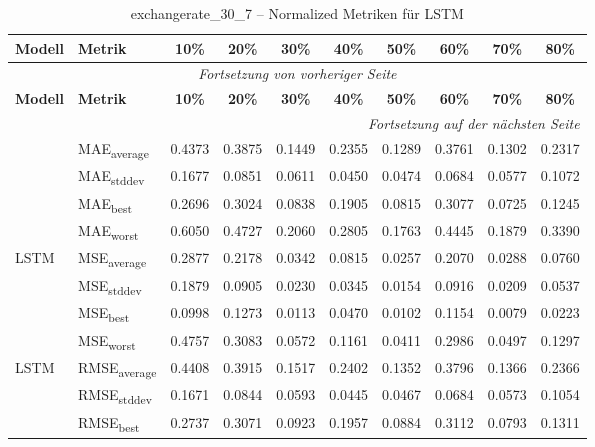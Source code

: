 {\small
\begin{longtable}{l l c c c c c c c c}
    \toprule
    \textbf{Modell} & \textbf{Metrik} & \textbf{10\%} & \textbf{20\%} & \textbf{30\%} & \textbf{40\%} & \textbf{50\%} & \textbf{60\%} & \textbf{70\%} & \textbf{80\%} \\
    \midrule
    \endfirsthead
    \multicolumn{10}{c}{\textit{Fortsetzung von vorheriger Seite}} \\
    \toprule
    \textbf{Modell} & \textbf{Metrik} & \textbf{10\%} & \textbf{20\%} & \textbf{30\%} & \textbf{40\%} & \textbf{50\%} & \textbf{60\%} & \textbf{70\%} & \textbf{80\%} \\
    \midrule
    \endhead
    \midrule
    \multicolumn{10}{r}{\textit{Fortsetzung auf der nächsten Seite}} \\
    \midrule
    \endfoot
    \bottomrule
    \caption{exchangerate_30_7 -- Normalized Metriken für LSTM}
    \label{tab:exchangerate_30_7_normalized_lstm}
    \endlastfoot
\multirow{4}{*}{LSTM} & MAE\textsubscript{average} & 0.4373 & 0.3875 & 0.1449 & 0.2355 & 0.1289 & 0.3761 & 0.1302 & 0.2317 \\
 & MAE\textsubscript{stddev} & 0.1677 & 0.0851 & 0.0611 & 0.0450 & 0.0474 & 0.0684 & 0.0577 & 0.1072 \\
 & MAE\textsubscript{best} & 0.2696 & 0.3024 & 0.0838 & 0.1905 & 0.0815 & 0.3077 & 0.0725 & 0.1245 \\
 & MAE\textsubscript{worst} & 0.6050 & 0.4727 & 0.2060 & 0.2805 & 0.1763 & 0.4445 & 0.1879 & 0.3390 \\
\cmidrule(lr){2-10}
\multirow{4}{*}{LSTM} & MSE\textsubscript{average} & 0.2877 & 0.2178 & 0.0342 & 0.0815 & 0.0257 & 0.2070 & 0.0288 & 0.0760 \\
 & MSE\textsubscript{stddev} & 0.1879 & 0.0905 & 0.0230 & 0.0345 & 0.0154 & 0.0916 & 0.0209 & 0.0537 \\
 & MSE\textsubscript{best} & 0.0998 & 0.1273 & 0.0113 & 0.0470 & 0.0102 & 0.1154 & 0.0079 & 0.0223 \\
 & MSE\textsubscript{worst} & 0.4757 & 0.3083 & 0.0572 & 0.1161 & 0.0411 & 0.2986 & 0.0497 & 0.1297 \\
\cmidrule(lr){2-10}
\multirow{4}{*}{LSTM} & RMSE\textsubscript{average} & 0.4408 & 0.3915 & 0.1517 & 0.2402 & 0.1352 & 0.3796 & 0.1366 & 0.2366 \\
 & RMSE\textsubscript{stddev} & 0.1671 & 0.0844 & 0.0593 & 0.0445 & 0.0467 & 0.0684 & 0.0573 & 0.1054 \\
 & RMSE\textsubscript{best} & 0.2737 & 0.3071 & 0.0923 & 0.1957 & 0.0884 & 0.3112 & 0.0793 & 0.1311 \\

\end{longtable}}
